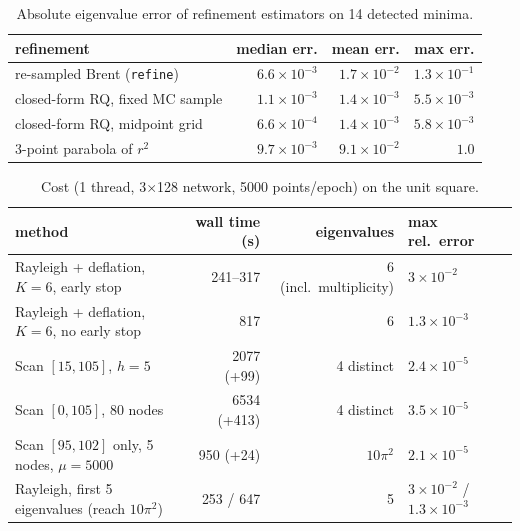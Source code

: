 \begin{table}[H]\centering\small
\begin{tabular}{lrrr}
\toprule
refinement & median err. & mean err. & max err.\\
\midrule
re-sampled Brent (\texttt{refine}) & $6.6\times10^{-3}$ & $1.7\times10^{-2}$ & $1.3\times10^{-1}$\\
closed-form RQ, fixed MC sample & $1.1\times10^{-3}$ & $1.4\times10^{-3}$ & $5.5\times10^{-3}$\\
closed-form RQ, midpoint grid & $6.6\times10^{-4}$ & $1.4\times10^{-3}$ & $5.8\times10^{-3}$\\
3-point parabola of $r^2$ & $9.7\times10^{-3}$ & $9.1\times10^{-2}$ & $1.0$\\
\bottomrule
\end{tabular}
\caption{Absolute eigenvalue error of refinement estimators on 14 detected minima.}
\end{table}

\begin{table}[H]\centering\small
\begin{tabular}{lrrl}
\toprule
method & wall time (s) & eigenvalues & max rel.\ error\\
\midrule
Rayleigh + deflation, $K=6$, early stop & 241--317 & 6 (incl.\ multiplicity) & $3\times10^{-2}$\\
Rayleigh + deflation, $K=6$, no early stop & 817 & 6 & $1.3\times10^{-3}$\\
Scan $[15,105]$, $h=5$ & 2077 (+99) & 4 distinct & $2.4\times10^{-5}$\\
Scan $[0,105]$, 80 nodes & 6534 (+413) & 4 distinct & $3.5\times10^{-5}$\\
Scan $[95,102]$ only, 5 nodes, $\mu=5000$ & 950 (+24) & $10\pi^2$ & $2.1\times10^{-5}$\\
Rayleigh, first 5 eigenvalues (reach $10\pi^2$) & 253 / 647 & 5 & $3\times10^{-2}$ / $1.3\times10^{-3}$\\
\bottomrule
\end{tabular}
\caption{Cost (1 thread, 3$\times$128 network, 5000 points/epoch) on the unit square.}
\end{table}

